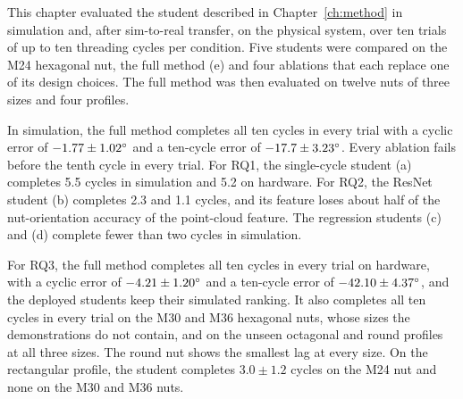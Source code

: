 This chapter evaluated the student described in Chapter~\ref{ch:method} in simulation and, after sim-to-real transfer, on the physical system, over ten trials of up to ten threading cycles per condition. Five students were compared on the M24 hexagonal nut, the full method (e) and four ablations that each replace one of its design choices. The full method was then evaluated on twelve nuts of three sizes and four profiles.

In simulation, the full method completes all ten cycles in every trial with a cyclic error of $-1.77\pm1.02^\circ$ and a ten-cycle error of $-17.7\pm3.23^\circ$. Every ablation fails before the tenth cycle in every trial. For RQ1, the single-cycle student (a) completes 5.5 cycles in simulation and 5.2 on hardware. For RQ2, the ResNet student (b) completes 2.3 and 1.1 cycles, and its feature loses about half of the nut-orientation accuracy of the point-cloud feature. The regression students (c) and (d) complete fewer than two cycles in simulation.

For RQ3, the full method completes all ten cycles in every trial on hardware, with a cyclic error of $-4.21\pm1.20^\circ$ and a ten-cycle error of $-42.10\pm4.37^\circ$, and the deployed students keep their simulated ranking. It also completes all ten cycles in every trial on the M30 and M36 hexagonal nuts, whose sizes the demonstrations do not contain, and on the unseen octagonal and round profiles at all three sizes. The round nut shows the smallest lag at every size. On the rectangular profile, the student completes $3.0\pm1.2$ cycles on the M24 nut and none on the M30 and M36 nuts.
